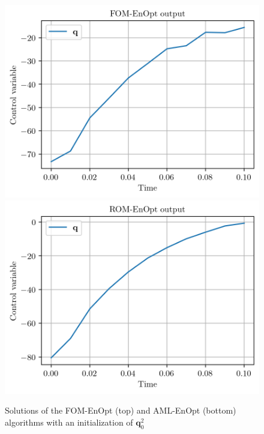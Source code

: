 \begin{figure}
\centering
\includegraphics{Plots/FOMInit-90.png}
\includegraphics{Plots/ROMInit-90.png}
\caption{\label{solutionsInit-90}Solutions of the FOM-EnOpt (top) and AML-EnOpt (bottom) algorithms with an initialization of $\mathbf{q}^2_0$}
\end{figure}

